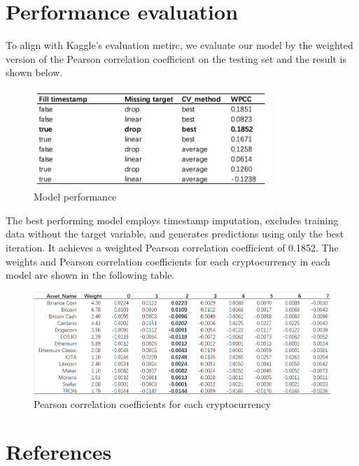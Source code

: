 \documentclass{article}
\begin{document}
\section{Performance evaluation}
To align with Kaggle's evaluation metirc, we evaluate our model by the weighted version of the Pearson correlation coefficient on the testing set and the result is shown below.

\begin{figure}[H]
	\centering
	\includegraphics[width=0.8\textwidth]{Model/Result.png}
	\caption{Model performance}
\end{figure}

The best performing model employs timestamp imputation, excludes training data without the target variable, and generates predictions using only the best iteration. It achieves a weighted Pearson correlation coefficient of 0.1852. The weights and Pearson correlation coefficients for each cryptocurrency in each model are shown in the following table.

\begin{figure}[H]
	\centering
	\includegraphics[width=1\textwidth]{Model/Detail for each asset.png}
	\caption{Pearson correlation coefficients for each cryptocurrency}
\end{figure}

\section*{References}

\medskip

\small
\end{document}
